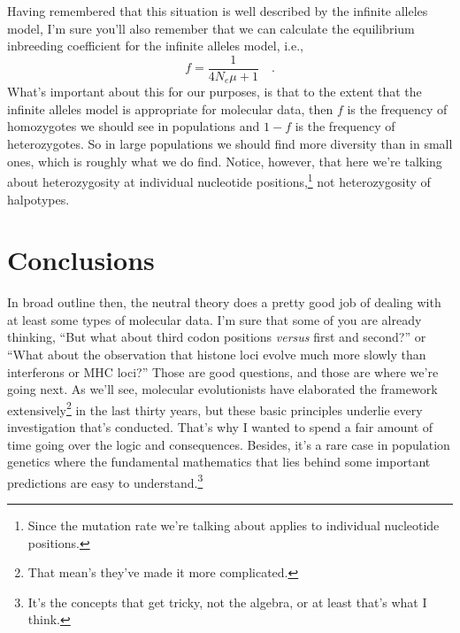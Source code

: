 Having remembered that this situation is well described by the
infinite alleles model, I'm sure you'll also remember that we can
calculate the equilibrium inbreeding coefficient for the infinite
alleles model, i.e.,
\[
f = \frac{1}{4N_e\mu + 1} \quad .
\]
What's important about this for our purposes, is that to the extent
that the infinite alleles model is appropriate for molecular data,
then $f$ is the frequency of homozygotes we should see in populations
and $1-f$ is the frequency of heterozygotes. So in large populations
we should find more diversity than in small ones, which is roughly
what we do find. Notice, however, that here we're talking about
heterozygosity at individual nucleotide positions,\footnote{Since the
  mutation rate we're talking about applies to individual nucleotide
  positions.} not heterozygosity of halpotypes.

\section*{Conclusions}

In broad outline then, the neutral theory does a pretty good job of
dealing with at least some types of molecular data. I'm sure that some
of you are already thinking, ``But what about third codon positions
{\it versus\/} first and second?'' or ``What about the observation
that histone loci evolve much more slowly than interferons or MHC
loci?''  Those are good questions, and those are where we're going
next. As we'll see, molecular evolutionists have elaborated the
framework extensively\footnote{That mean's they've made it more
  complicated.} in the last thirty years, but these basic principles
underlie every investigation that's conducted. That's why I wanted to
spend a fair amount of time going over the logic and
consequences. Besides, it's a rare case in population genetics where
the fundamental mathematics that lies behind some important
predictions are easy to understand.\footnote{It's the concepts that
  get tricky, not the algebra, or at least that's what I think.}

